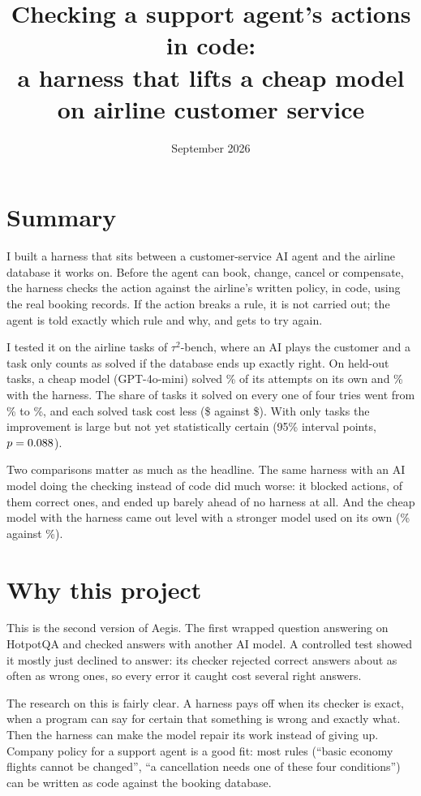 \documentclass[11pt]{article}
\title{\textbf{Checking a support agent's actions in code:}\\a harness that lifts a cheap model on airline customer service}
\author{\AuthorName}
\date{September 2026}
\begin{document}
\maketitle

\section*{Summary}

I built a harness that sits between a customer-service AI agent and the
airline database it works on. Before the agent can book, change, cancel or
compensate, the harness checks the action against the airline's written
policy, in code, using the real booking records. If the action breaks a rule,
it is not carried out; the agent is told exactly which rule and why, and gets
to try again.

I tested it on the airline tasks of $\tau^2$-bench, where an AI plays the
customer and a task only counts as solved if the database ends up exactly
right. On \NTasks{} held-out tasks, a cheap model (GPT-4o-mini) solved
\PlainPass\% of its attempts on its own and \CodePass\% with the harness. The
share of tasks it solved on every one of four tries went from \PlainPassK\% to
\CodePassK\%, and each solved task cost less (\$\CodeCostSuccess{} against
\$\PlainCostSuccess). With only \NTasks{} tasks
the improvement is large but not yet statistically certain (95\% interval
\BvACI{} points, $p = 0.088$).

Two comparisons matter as much as the headline. The same harness with an AI
model doing the checking instead of code did much worse: it blocked
\LlmBlocked{} actions, \LlmFalseBlocks{} of them correct ones, and ended up
barely ahead of no harness at all. And the cheap model with the harness came
out level with a stronger model used on its own (\CodePass\% against
\StrongPass\%).

\section{Why this project}

This is the second version of Aegis. The first wrapped question answering on
HotpotQA and checked answers with another AI model. A controlled test showed
it mostly just declined to answer: its checker rejected correct answers about
as often as wrong ones, so every error it caught cost several right answers.

The research on this is fairly clear. A harness pays off when its checker is
exact, when a program can say for certain that something is wrong and exactly
what. Then the harness can make the model repair its work instead of giving
up. Company policy for a support agent is a good fit: most rules
(``basic economy flights cannot be changed'', ``a cancellation needs one of
these four conditions'') can be written as code against the booking database.
\end{document}

